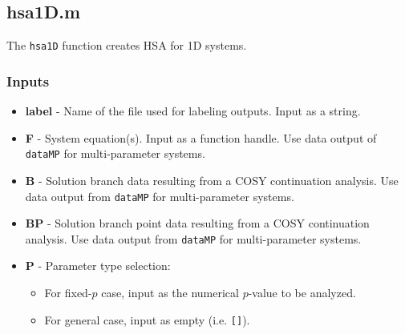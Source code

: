 \documentclass[12pt]{article}
\begin{document}
\subsection{hsa1D.m}
The \texttt{hsa1D} function creates HSA for 1D systems. 

\subsubsection{Inputs}
\begin{itemize}
\item \textbf{label} - Name of the file used for labeling outputs. Input as a string.

\item \textbf{F} - System equation(s). Input as a function handle. Use data output of \texttt{dataMP} for multi-parameter systems.

\item \textbf{B} - Solution branch data resulting from a COSY continuation analysis. Use data output from \texttt{dataMP} for multi-parameter systems.

\item \textbf{BP} - Solution branch point data resulting from a COSY continuation analysis. Use data output from \texttt{dataMP} for multi-parameter systems.

\item \textbf{P} - Parameter type selection:
	\begin{itemize}
	\item For fixed-$p$ case, input as the numerical $p$-value to be analyzed.
	\item For general case, input as empty (i.e. \texttt{[]}).
	\end{itemize}


\end{itemize}
\end{document}
